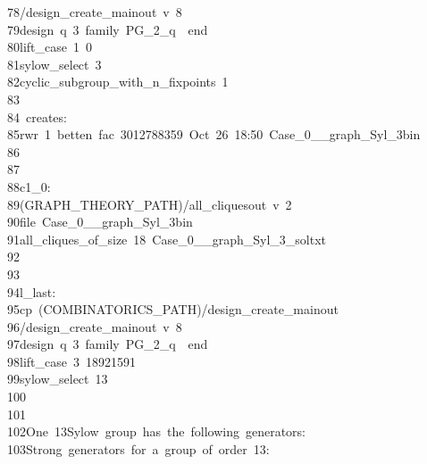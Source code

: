 \begin{tabbing}
78\>\>/design\_create\_mainout\ v\ 8\ \ \\[0pt]
79\>\>\>design\ q\ 3\ family\ PG\_2\_q\ \ end\ \\[0pt]
80\>\>\>lift\_case\ 1\ 0\ \\[0pt]
81\>\>\>sylow\_select\ 3\ \\[0pt]
82\>\>\>cyclic\_subgroup\_with\_n\_fixpoints\ 1\\[0pt]
83\>\\[0pt]
84\>\ creates:\\[0pt]
85\>rwr\ 1\ betten\ fac\ 3012788359\ Oct\ 26\ 18:50\ Case\_0\_\_graph\_Syl\_3bin\\[0pt]
86\>\\[0pt]
87\>\\[0pt]
88\>c1\_0:\\[0pt]
89\>\>(GRAPH\_THEORY\_PATH)/all\_cliquesout\ v\ 2\ \\[0pt]
90\>\>\>file\ Case\_0\_\_graph\_Syl\_3bin\ \\[0pt]
91\>\>\>all\_cliques\_of\_size\ 18\ Case\_0\_\_graph\_Syl\_3\_soltxt\ \\[0pt]
92\>\\[0pt]
93\>\\[0pt]
94\>l\_last:\\[0pt]
95\>\>cp\ (COMBINATORICS\_PATH)/design\_create\_mainout\ \\[0pt]
96\>\>/design\_create\_mainout\ v\ 8\ \ \\[0pt]
97\>\>\>design\ q\ 3\ family\ PG\_2\_q\ \ end\ \\[0pt]
98\>\>\>lift\_case\ 3\ 18921591\ \\[0pt]
99\>\>\>sylow\_select\ 13\\[0pt]
100\>\\[0pt]
101\>\\[0pt]
102\>One\ 13Sylow\ group\ has\ the\ following\ generators:\\[0pt]
103\>Strong\ generators\ for\ a\ group\ of\ order\ 13:\\[0pt]

\end{tabbing}
